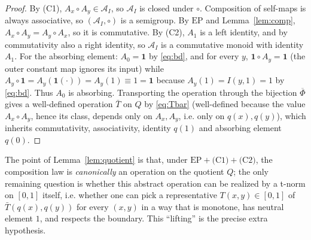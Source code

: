 \documentclass{amsart}
\theoremstyle{definition}
\theoremstyle{remark}
\newcommand{\zo}{[0,1]}
\newcommand{\EP}{\mathrm{EP}}
\newcommand{\Ax}{A}
\begin{document}
\begin{proof}
By (C1), $\Ax_x\circ\Ax_y\in\mathcal A_I$, so $\mathcal A_I$ is closed under $\circ$.
Composition of self-maps is always associative, so $(\mathcal A_I,\circ)$ is a semigroup.
By $\EP$ and Lemma~\ref{lem:comp}, $\Ax_x\circ\Ax_y=\Ax_y\circ\Ax_x$, so it is commutative.
By (C2), $\Ax_1$ is a left identity, and by commutativity also a right identity, so
$\mathcal A_I$ is a commutative monoid with identity $\Ax_1$. For the absorbing element:
$\Ax_0=\mathbf 1$ by \eqref{eq:bd}, and for every $y$, $\mathbf 1\circ\Ax_y=\mathbf 1$ (the
outer constant map ignores its input) while $\Ax_y\circ\mathbf 1=\Ax_y(\mathbf1(\cdot))
=\Ax_y(1)\equiv 1=\mathbf1$ because $\Ax_y(1)=I(y,1)=1$ by \eqref{eq:bd}. Thus $\Ax_0$ is
absorbing. Transporting the operation through the bijection $\overline\Phi$ gives a
well-defined operation $\bar T$ on $Q$ by \eqref{eq:Tbar} (well-defined because the value
$\Ax_x\circ\Ax_y$, hence its class, depends only on $\Ax_x,\Ax_y$, i.e. only on
$q(x),q(y)$), which inherits commutativity, associativity, identity $q(1)$ and absorbing
element $q(0)$.
\end{proof}

The point of Lemma~\ref{lem:quotient} is that, under $\EP+\text{(C1)}+\text{(C2)}$, the
composition law is \emph{canonically} an operation on the quotient $Q$; the only remaining
question is whether this abstract operation can be realized by a t-norm on $\zo$ itself,
i.e. whether one can pick a representative $T(x,y)\in\zo$ of $\bar T(q(x),q(y))$ for every
$(x,y)$ in a way that is monotone, has neutral element $1$, and respects the boundary. This
``lifting'' is the precise extra hypothesis.
\end{document}
